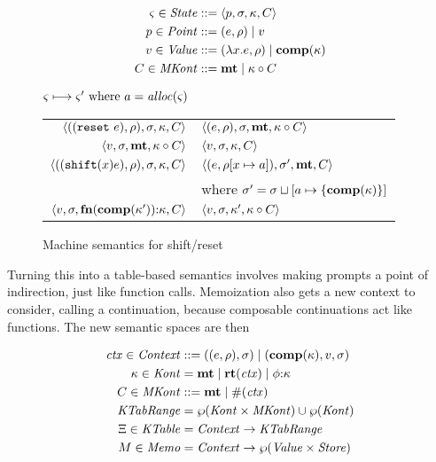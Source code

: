 \begin{align*}
  \varsigma \in \mathit{State} &::= \langle p, \sigma, \kappa, C \rangle \\
  p \in \mathit{Point} &::= (e, \rho) \mid v \\
  v \in \mathit{Value} &::= (\lambda{} x. e, \rho) \mid \mathbf{comp}(\kappa) \\
  C \in \mathit{MKont} &::= \mathbf{mt} \mid \kappa\circ C
\end{align*}

\begin{figure}
  \centering
  $\varsigma \longmapsto \varsigma' \text{ where } a = \mathit{alloc}(\varsigma)$ \\
  \begin{tabular}{r|l}
    \hline
    $\langle ((\texttt{reset}\ e), \rho), \sigma, \kappa, C \rangle$
    &
    $\langle (e, \rho), \sigma, \mathbf{mt}, \kappa\circ C \rangle$
    \\
    $\langle v, \sigma, \mathbf{mt}, \kappa\circ C \rangle$
    &
    $\langle v, \sigma, {\kappa}, {C} \rangle$
    \\
    $\langle ((\texttt{shift} (x) e), \rho), \sigma, \kappa, C \rangle$
    &
    $\langle (e, \rho[x \mapsto a]), \sigma',\mathbf{mt},C \rangle$
    \\ & where $\sigma' = \sigma\sqcup[a \mapsto \{ \mathbf{comp}(\kappa) \}]$
    \\
    $\langle v,\sigma,\mathbf{fn}{}(\mathbf{comp}(\kappa')){\tt :} \kappa, C \rangle$
    &
    $\langle v, \sigma, \kappa', \kappa\circ C \rangle$
  \end{tabular}  
  \caption{Machine semantics for shift/reset}
  \label{fig:shift-reset}
\end{figure}

Turning this into a table-based semantics involves making prompts a point of indirection, just like function calls.
%
Memoization also gets a new context to consider, calling a continuation, because composable continuations act like functions.
%
The new semantic spaces are then

\begin{align*}
  \mathit{ctx} \in \mathit{Context} &::= ((e,\rho),\sigma) \mid (\mathbf{comp}(\kappa),v,\sigma) \\
  \kappa \in \mathit{Kont} &= \mathbf{mt} \mid \mathbf{rt}(\mathit{ctx}) \mid \phi{\tt :} \kappa \\
  C \in \mathit{MKont} &::= \mathbf{mt} \mid \#(\mathit{ctx}) \\
  \mathit{KTabRange} &= \wp(\mathit{Kont} \times \mathit{MKont}) \cup \wp(\mathit{Kont}) \\
  \Xi \in \mathit{KTable} &= \mathit{Context} \to \mathit{KTabRange} \\
  M \in \mathit{Memo} &= \mathit{Context} \to \wp(\mathit{Value} \times \mathit{Store})
\end{align*}

